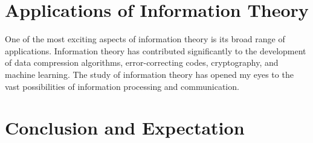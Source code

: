 \documentclass[a4paper,conference]{IEEEtran}
\begin{document}

\section{Applications of Information Theory}
One of the most exciting aspects of information theory is its broad range of applications. Information theory has contributed significantly to the development of data compression algorithms, error-correcting codes, cryptography, and machine learning. The study of information theory has opened my eyes to the vast possibilities of information processing and communication.

\section{Conclusion and Expectation}


\end{document}
